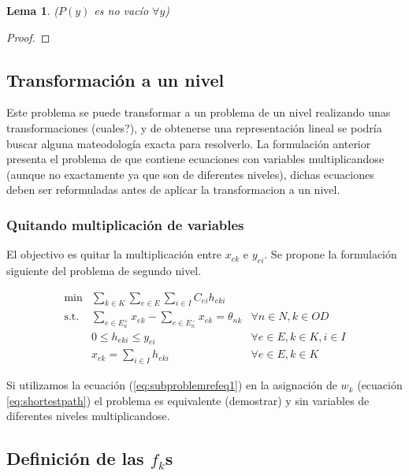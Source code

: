 \documentclass{article}
\newtheorem{lemma}{Lema}
\begin{document}
  \begin{lemma}($P(y)$ es no vacío $\forall y$)
  \end{lemma}

  \begin{proof}
    
  \end{proof}

  \subsection*{Transformación a un nivel}

  Este problema se puede transformar a un problema de un nivel realizando unas transformaciones (cuales?), y de obtenerse una representación lineal se podría buscar alguna mateodología exacta para resolverlo. La formulación anterior presenta el problema de que contiene ecuaciones con variables multiplicandose (aunque no exactamente ya que son de diferentes niveles), dichas ecuaciones deben ser reformuladas antes de aplicar la transformacion a un nivel.

  \subsubsection*{Quitando multiplicación de variables}

  El objectivo es quitar la multiplicación entre $x_{ek}$ e $y_{ei}$. Se propone la formulación siguiente del problema de segundo nivel.

  \begin{align}
    \text{min}  & \sum_{k \in K} \sum_{e \in E} \sum_{i \in I} C_{ei} h_{eki}         & \label{eq:subproblemrefeq1} \\
    \text{s.t.} & \sum_{e \in E_n^+} x_{ek} - \sum_{e \in E_n^-} x_{ek} = \theta_{nk} & \forall n \in N, k \in OD \\
                & 0 \leq h_{eki} \leq y_{ei}                                          & \forall e \in E, k \in K, i \in I \\
                & x_{ek} = \sum_{i \in I} h_{eki}                                     & \forall e \in E, k \in K
  \end{align}

  Si utilizamos la ecuación (\ref{eq:subproblemrefeq1}) en la asignación de $w_k$ (ecuación \ref{eq:shortestpath}) el problema es equivalente (demostrar) y sin variables de diferentes niveles multiplicandose.

  \subsection*{Definición de las $f_k$s}
\end{document}
